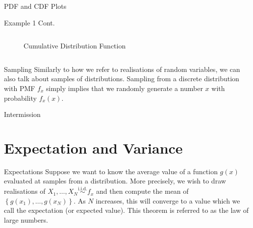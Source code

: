 \documentclass[10pt]{beamer}
\begin{document}
\begin{frame}[fragile]{PDF and CDF Plots}
\begin{exampleblock}{Example 1 Cont.}
\begin{columns}
\begin{column}{0.425\textwidth}
\begin{figure}
    \caption{Cumulative Distribution Function}
\end{figure}
\end{column}
\end{columns}
\end{exampleblock}
\end{frame}

\begin{frame}[fragile]{Sampling}
Similarly to how we refer to realisations of random variables, we can also talk about samples of distributions. Sampling from a discrete distribution with PMF \(f_x\) simply implies that we randomly generate a number \(x\) with probability \(f_x\left(x\right)\).


\end{frame}

\begin{frame}[standout]
Intermission
\end{frame}

\section{Expectation and Variance}

\begin{frame}[fragile]{Expectations}
Suppose we want to know the average value of a function \(g\left(x\right)\) evaluated at samples from a distribution. More precisely, we wish to draw realisations of \(X_1, \dots, X_N \overset{\textrm{i.i.d.}}{\sim} f_x\) and then compute the mean of \(\left\{g\left(x_1\right), \dots, g\left(x_N\right)\right\}\). As \(N\) increases, this will converge to a value which we call the expectation (or expected value). This theorem is referred to as the law of large numbers.

\end{frame}
\end{document}
